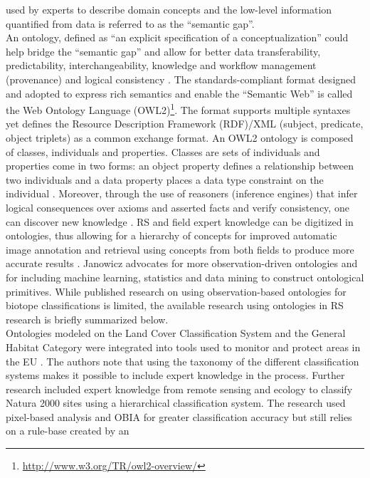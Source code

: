\documentclass[authoryear, review,12pt,number]{elsarticle}
\begin{document}
used by experts to describe domain concepts and the low-level information
quantified from data is referred to as the ``semantic gap''.
\\
An ontology, defined as ``an explicit specification of a conceptualization''
\citep{gruber1993} could help bridge the ``semantic gap'' and allow for better
data transferability, predictability, interchangeability, knowledge and workflow
management (provenance) and logical consistency \citep{Janowicz2012}.
The standards-compliant format designed and adopted to express rich semantics 
and enable the ``Semantic Web'' is called the Web Ontology 
Language (OWL2)\footnote{\url{http://www.w3.org/TR/owl2-overview/}}. The 
format supports multiple syntaxes yet defines the Resource Description 
Framework (RDF)/XML (subject, predicate, object triplets) as a common exchange 
format. An OWL2 ontology is composed of classes, individuals 
and properties. Classes are sets of individuals and properties come in 
two forms: an object property defines a relationship between two individuals 
and a data property  places a data type constraint on the 
individual \citep{OWL2}.
Moreover, through the use of reasoners (inference engines) that infer logical
consequences over axioms and asserted facts and verify consistency, one can
discover new knowledge \citep{Arvor2013, Andres2013a}. RS and field expert
knowledge can be digitized in ontologies, thus allowing for a hierarchy of
concepts for improved automatic image annotation and retrieval using concepts
from both fields to produce more accurate results \cite{Srikanth_2005}. Janowicz
\citep{Janowicz2012} advocates for more observation-driven ontologies and for
including machine learning, statistics and data mining to construct ontological
primitives. While published research on using observation-based ontologies for
biotope classifications is limited, the available research using ontologies in
RS research is briefly summarized below. 
\\
Ontologies modeled on the Land Cover Classification System and the General
Habitat Category were integrated into tools used to monitor and protect areas in
the EU \citep{Arvor2013}. The authors note that using the taxonomy of the
different classification systems makes it possible to include expert knowledge
in the process.  Further research included expert knowledge from remote sensing
and ecology to classify Natura 2000 sites using a hierarchical classification
system. The research used pixel-based analysis and OBIA for greater
classification accuracy but still relies on a rule-base created by an
\end{document}
